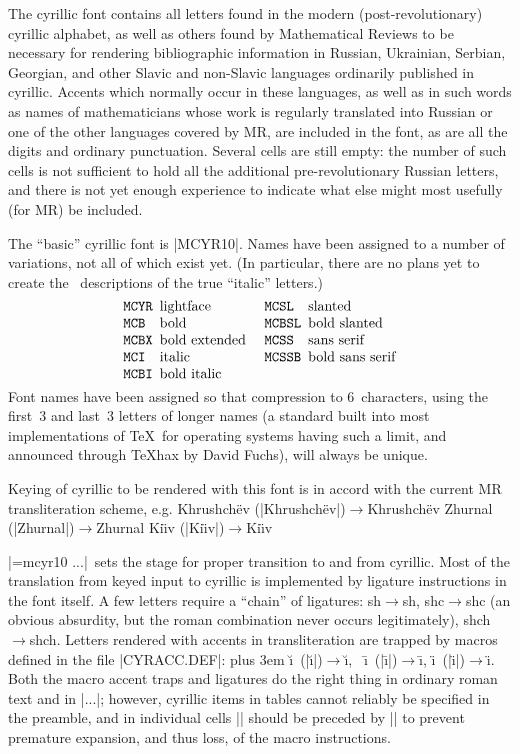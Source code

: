 The cyrillic font contains all letters found in the modern
(post-revolutionary) cyrillic alphabet, as well as others found by
Mathematical Reviews to be necessary for rendering bibliographic
information in Russian, Ukrainian, Serbian, Georgian, and other Slavic
and non-Slavic languages ordinarily published in cyrillic.  Accents
which normally occur in these languages, as well as in such words as
names of mathematicians whose work is regularly translated into
Russian or one of the other languages covered by MR, are included in
the font, as are all the digits and ordinary punctuation.  Several
cells are still empty: the number of such cells is not sufficient to
hold all the additional pre-revolutionary Russian letters, and there
is not yet enough experience to indicate what else might most usefully
(for MR) be included.

The ``basic'' cyrillic font is |MCYR10|.  Names have been assigned to
a number of variations, not all of which exist yet.  (In particular,
there are no plans yet to create the \MF\ descriptions of the true
``italic'' letters.)
$$\vbox{\halign{#\quad&&{\tt#\unskip}\hfil\enspace&#\hfil\quad\cr
	&MCYR &	lightface &		MCSL &	slanted\cr
	&MCB &	bold &			MCBSL &	bold slanted\cr
	&MCBX &	bold extended & 	MCSS &	sans serif\cr
	&MCI &	italic &		MCSSB &	bold sans serif\cr
	&MCBI &	bold italic\cr
}}$$
Font names have been assigned so that compression
to 6~characters, using the first~3 and last~3 letters of longer names
(a standard built into most implementations of \TeX\ for operating systems
having such a limit, and announced through \TeX hax by David Fuchs),
will always be unique.

Keying of cyrillic to be rendered with this font is in accord with the
current MR transliteration scheme, e.g.
{\obeylines
	Khrushch\"ev (|Khrushch\"ev|)${}\to{}${\cyr Khrushch\"ev}
	Zhurnal (|Zhurnal|)${}\to{}${\cyr Zhurnal}
	Ki{\"\i}v (|Ki{\"\i}v|)${}\to{}${\cyr Ki{\"\i}v}
}		%

\NoBlackBoxes
\noindent
|\font\tencyr=mcyr10 \def\cyr{\tencyr\cyracc} {\cyr ...}|\ sets the
stage for proper transition to and from cyrillic.
Most of the translation from keyed input to cyrillic is implemented by
ligature instructions in the font itself.  A few letters require a
``chain'' of ligatures: sh${}\to{}${\cyr sh}, shc${}\to{}${\cyr shc}
(an obvious absurdity, but the roman combination never occurs legitimately),
shch${}\to{}${\cyr shch}.  Letters rendered with accents in transliteration
are trapped by macros defined in the file |CYRACC.DEF|\null:\hskip0pt plus 3em
\u\i\ (|\u\i|)${}\to{}${\cyr\u\i},\ %
\=\i\ (|\=\i|)${}\to{}${\cyr\=\i},
\"\i\ (|\"\i|)${}\to{}${\cyr\"\i}.  Both the macro accent traps and
ligatures do the right thing in ordinary roman text and in |{\cyr ...}|;
however, cyrillic items in tables cannot reliably be specified in the
preamble, and in individual cells |\cyr| should be preceded by |\relax|
to prevent premature expansion, and thus loss, of the macro instructions.

